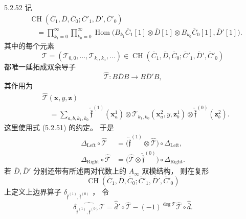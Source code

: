\begin{definition}{5.2.52}\label{def:5-2-52}
记
\[
\begin{aligned}
&\operatorname{CH}
(\overline C_1,\overline D,\overline C_0;
 \overline C'_1,\overline D',\overline C'_0)
\\
&\quad=
\prod_{k_1=0}^{\infty}
\prod_{k_0=0}^{\infty}
\operatorname{Hom}\bigl(
B_{k_1}\overline C_1[1]\otimes
\overline D[1]\otimes
B_{k_0}\overline C_0[1],
\overline D'[1]\bigr).
\end{aligned}
\]
其中的每个元素
\[
\mathcal T
=(\mathcal T_{0,0},\ldots,
  \mathcal T_{k_1,k_0},\ldots)
\in
\operatorname{CH}
(\overline C_1,\overline D,\overline C_0;
 \overline C'_1,\overline D',\overline C'_0)
\]
都唯一延拓成双余导子
\[
\widehat{\mathcal T}:
B\overline D B\longrightarrow
B\overline D'B,
\]
其作用为
\[
\begin{aligned}
&\widehat{\mathcal T}
(\mathbf x,y,\mathbf z)
\\
&\quad=
\sum_{a,b,k_1,k_0}
\widehat{\overline{\mathfrak f}}^{(1)}
(\mathbf x_a^1)
\otimes
\mathcal T_{k_1,k_0}
(\mathbf x_a^2,y,\mathbf z_b^1)
\otimes
\widehat{\overline{\mathfrak f}}^{(0)}
(\mathbf z_b^2).
\end{aligned}
\]
这里使用式 (5.2.51) 的约定。
于是
\[
\begin{aligned}
\Delta_{\mathrm{Left}}\circ
\widehat{\mathcal T}
&=
\bigl(
\widehat{\overline{\mathfrak f}}^{(1)}
\otimes\widehat{\mathcal T}
\bigr)
\circ\Delta_{\mathrm{Left}},
\\
\Delta_{\mathrm{Right}}\circ
\widehat{\mathcal T}
&=
\bigl(
\widehat{\mathcal T}
\otimes
\widehat{\overline{\mathfrak f}}^{(0)}
\bigr)
\circ\Delta_{\mathrm{Right}}.
\end{aligned}
\]
若 $\overline D,\overline D'$
分别还带有所述两对代数上的
$A_\infty$ 双模结构，
则在复形
\[
\operatorname{CH}
(\overline C_1,\overline D,\overline C_0;
 \overline C'_1,\overline D',\overline C'_0)
\]
上定义上边界算子
$\delta_{\overline{\mathfrak f}^{(1)},
         \overline{\mathfrak f}^{(0)}}$
，
令
\[
\widehat{
\delta_{\overline{\mathfrak f}^{(1)},
       \overline{\mathfrak f}^{(0)}}
\mathcal T}
=
\widehat{\overline d}'\circ
\widehat{\mathcal T}
-(-1)^{\deg\mathcal T}
\widehat{\mathcal T}\circ
\widehat{\overline d}.
\]
\end{definition}

